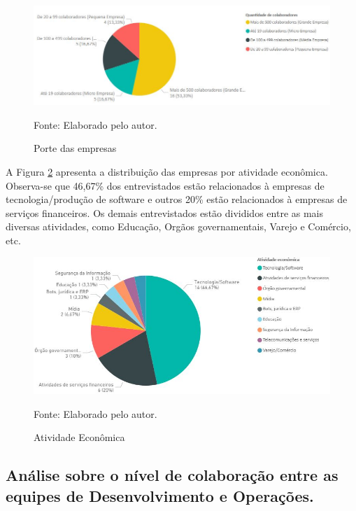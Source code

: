 \documentclass[twoside,english,brazilian]{UNISINOSartigo}
\newcommand{\source}[1]{\caption*{Fonte: {#1}} }
\begin{document}
\begin{figure}[H]
    \centering
    \caption{Porte das empresas}
       \includegraphics[scale=.6]{imagens/colaboradores_pbi.JPG}
        \source{Elaborado pelo autor.}
     \label{fig:PorteEmpresas}
    \end{figure}

A Figura \ref{fig:colaboradores} apresenta a distribuição das empresas por atividade econômica. Observa-se que 46,67\% dos entrevistados estão relacionados à empresas de tecnologia/produção de software e outros 20\% estão relacionados à empresas de serviços financeiros. Os demais entrevistados estão divididos entre as mais diversas atividades, como Educação, Orgãos governamentais, Varejo e Comércio, etc.

\begin{figure}[H]
    \centering
    \caption{Atividade Econômica}
       \includegraphics[scale=.6]{imagens/atividadeEcon_PBI.JPG}
        \source{Elaborado pelo autor.}
    \label{fig:colaboradores}
\end{figure}

\subsection{Análise sobre o nível de colaboração entre as equipes de Desenvolvimento e Operações.}
\end{document}
